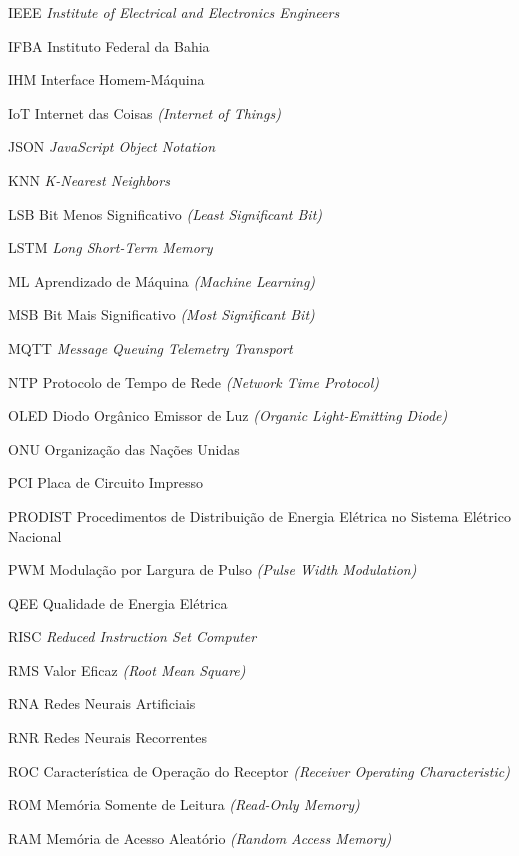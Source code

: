 \begin{acronym}
  \item[IEEE] \qquad \textit{Institute of Electrical and Electronics Engineers}
  \item[IFBA] \qquad Instituto Federal da Bahia
  \item[IHM] \qquad Interface Homem-Máquina
  \item[IoT] \qquad Internet das Coisas \textit{(Internet of Things)}
  \item[JSON] \qquad \textit{JavaScript Object Notation}
  \item[KNN] \qquad \textit{K-Nearest Neighbors}
  \item[LSB] \qquad Bit Menos Significativo \textit{(Least Significant Bit)}
  \item[LSTM] \qquad \textit{Long Short-Term Memory}
  \item[ML] \qquad Aprendizado de Máquina \textit{(Machine Learning)}
  \item[MSB] \qquad Bit Mais Significativo \textit{(Most Significant Bit)}
  \item[MQTT] \qquad \textit{Message Queuing Telemetry Transport}
  \item[NTP] \qquad Protocolo de Tempo de Rede \textit{(Network Time Protocol)}
  \item[OLED] \qquad Diodo Orgânico Emissor de Luz \textit{(Organic Light-Emitting Diode)}
  \item[ONU] \qquad Organização das Nações Unidas
  \item[PCI] \qquad Placa de Circuito Impresso
  \item[PRODIST] \qquad Procedimentos de Distribuição de Energia Elétrica no Sistema Elétrico Nacional
  \item[PWM] \qquad Modulação por Largura de Pulso \textit{(Pulse Width Modulation)}
  \item[QEE] \qquad Qualidade de Energia Elétrica
  \item[RISC] \qquad \textit{Reduced Instruction Set Computer}
  \item[RMS] \qquad Valor Eficaz \textit{(Root Mean Square)}
  \item[RNA] \qquad Redes Neurais Artificiais
  \item[RNR] \qquad Redes Neurais Recorrentes
  \item[ROC] \qquad Característica de Operação do Receptor \textit{(Receiver Operating Characteristic)}
  \item[ROM] \qquad Memória Somente de Leitura \textit{(Read-Only Memory)}
  \item[RAM] \qquad Memória de Acesso Aleatório \textit{(Random Access Memory)}

\end{acronym}
